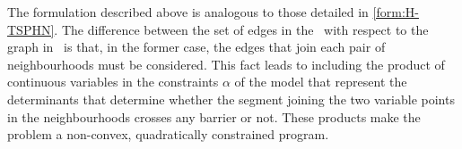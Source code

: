 \documentclass[a4paper,  review, authoryear, 1p.]{elsarticle}
\newcommand{\TSPHN}{{\sf{H-TSPHN}\xspace }}
\newcommand{\TSPN}{{\sf{H-TSPN}\xspace }}
\begin{document}
	The formulation described above is analogous to those detailed in \eqref{form:H-TSPHN}.
	The difference between the set of edges in the \TSPN \ with respect to the graph in \TSPHN \ is that, in the former case, the edges that join each pair of neighbourhoods must be considered. This fact leads to including the product of continuous variables in the constraints $\alpha$ of the model that represent the determinants that determine whether the segment joining the two variable points in the neighbourhoods crosses any barrier or not. These products make the problem a non-convex, quadratically constrained program.
	
	
	
	
	
\end{document}
